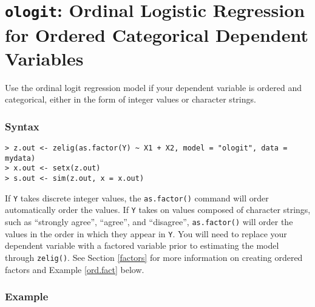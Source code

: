 

\usepackage{Sweave}

\nobibliography*


\section{{\tt ologit}: Ordinal Logistic Regression for Ordered
Categorical Dependent Variables}\label{ologit}

Use the ordinal logit regression model if your dependent variable is
ordered and categorical, either in the form of integer values or character strings.  

\subsubsection{Syntax}

\begin{verbatim}
> z.out <- zelig(as.factor(Y) ~ X1 + X2, model = "ologit", data = mydata)
> x.out <- setx(z.out)
> s.out <- sim(z.out, x = x.out)
\end{verbatim}
If {\tt Y} takes discrete integer values, the {\tt as.factor()}
command will order automatically order the values.  If {\tt Y} takes
on values composed of character strings, such as ``strongly agree'',
``agree'', and ``disagree'', {\tt as.factor()} will order the values
in the order in which they appear in {\tt Y}.  You will need to
replace your dependent variable with a factored variable prior to
estimating the model through {\tt zelig()}.  See Section \ref{factors}
for more information on creating ordered factors and Example
\ref{ord.fact} below.

\subsubsection{Example}

